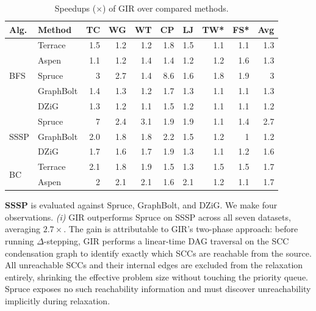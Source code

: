 \begin{table}[t]
\centering
\setlength{\tabcolsep}{4.8pt}
\caption{Speedups ($\times$) of GIR over compared methods.
\protect{}}
\begin{tabular}{l l r r r r r r r r}
\toprule
\textbf{Alg.} & \textbf{Method}
& \textbf{TC} & \textbf{WG} & \textbf{WT} & \textbf{CP} & \textbf{LJ} & \textbf{TW*} & \textbf{FS*} & \textbf{Avg} \\
\midrule

\multirow{5}{*}{BFS}
& Terrace   & 1.5 & 1.2 & 1.2 & 1.8 & 1.5 & 1.1 & 1.1 & 1.3 \\
& Aspen     & 1.1 & 1.2 & 1.4 & 1.4 & 1.2 & 1.2 & 1.6 & 1.3 \\
& Spruce    &   3 & 2.7 & 1.4 & 8.6 & 1.6 & 1.8 & 1.9 &   3 \\
& GraphBolt & 1.4 & 1.3 & 1.2 & 1.7 & 1.3 & 1.1 & 1.1 & 1.3 \\
& DZiG      & 1.3 & 1.2 & 1.1 & 1.5 & 1.2 & 1.1 & 1.1 & 1.2 \\

\midrule

\multirow{3}{*}{SSSP}
& Spruce    &   7 & 2.4 & 3.1 & 1.9 & 1.9 & 1.1 & 1.4 & 2.7 \\
& GraphBolt & 2.0 & 1.8 & 1.8 & 2.2 & 1.5 & 1.2 & 1 & 1.2 \\
& DZiG      & 1.7 & 1.6 & 1.7 & 1.9 & 1.3 & 1.1 & 1.2 & 1.6 \\

\midrule

\multirow{2}{*}{BC}
& Terrace & 2.1 & 1.8 & 1.9 & 1.5 & 1.3 & 1.5 & 1.5 & 1.7 \\
& Aspen   & 2 & 2.1 & 2.1 & 1.6 & 2.1 & 1.2 & 1.1 & 1.7 \\

\bottomrule
\end{tabular}
\label{tab:speedup_summary_alg}
\end{table}

\textbf{SSSP} is evaluated against Spruce, GraphBolt, and DZiG.
We make four observations.
\textit{(i)} GIR outperforms Spruce on SSSP across all seven datasets, averaging $2.7\times$.
The gain is attributable to GIR's two-phase approach: before running $\Delta$-stepping, GIR performs a linear-time DAG traversal on the SCC condensation graph to identify exactly which SCCs are reachable from the source.
All unreachable SCCs and their internal edges are excluded from the relaxation entirely, shrinking the effective problem size without touching the priority queue.
Spruce exposes no such reachability information and must discover unreachability implicitly during relaxation.

